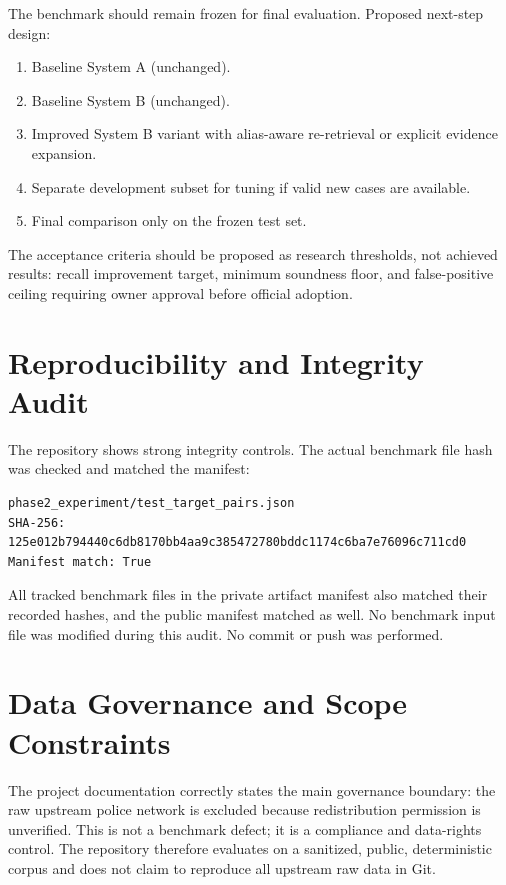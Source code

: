 \documentclass[11pt,a4paper]{article}
\begin{document}
The benchmark should remain frozen for final evaluation. Proposed next-step design:

\begin{enumerate}[leftmargin=1.5em]
  \item Baseline System A (unchanged).
  \item Baseline System B (unchanged).
  \item Improved System B variant with alias-aware re-retrieval or explicit evidence expansion.
  \item Separate development subset for tuning if valid new cases are available.
  \item Final comparison only on the frozen test set.
\end{enumerate}

The acceptance criteria should be proposed as research thresholds, not achieved results: recall improvement target, minimum soundness floor, and false-positive ceiling requiring owner approval before official adoption.

\section{Reproducibility and Integrity Audit}

The repository shows strong integrity controls. The actual benchmark file hash was checked and matched the manifest:

\begin{verbatim}
phase2_experiment/test_target_pairs.json
SHA-256: 125e012b794440c6db8170bb4aa9c385472780bddc1174c6ba7e76096c711cd0
Manifest match: True
\end{verbatim}

All tracked benchmark files in the private artifact manifest also matched their recorded hashes, and the public manifest matched as well. No benchmark input file was modified during this audit. No commit or push was performed.

\section{Data Governance and Scope Constraints}

The project documentation correctly states the main governance boundary: the raw upstream police network is excluded because redistribution permission is unverified. This is not a benchmark defect; it is a compliance and data-rights control. The repository therefore evaluates on a sanitized, public, deterministic corpus and does not claim to reproduce all upstream raw data in Git.
\end{document}
